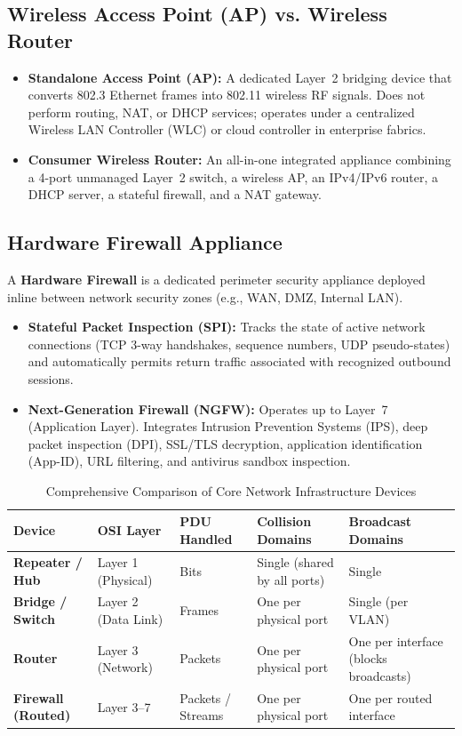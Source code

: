\subsection{Wireless Access Point (AP) vs. Wireless Router}
\begin{itemize}[leftmargin=*]
    \item \textbf{Standalone Access Point (AP):} A dedicated Layer~2 bridging device that converts 802.3 Ethernet frames into 802.11 wireless RF signals. Does not perform routing, NAT, or DHCP services; operates under a centralized Wireless LAN Controller (WLC) or cloud controller in enterprise fabrics.
    \item \textbf{Consumer Wireless Router:} An all-in-one integrated appliance combining a 4-port unmanaged Layer~2 switch, a wireless AP, an IPv4/IPv6 router, a DHCP server, a stateful firewall, and a NAT gateway.
\end{itemize}

\subsection{Hardware Firewall Appliance}
A \textbf{Hardware Firewall} is a dedicated perimeter security appliance deployed inline between network security zones (e.g., WAN, DMZ, Internal LAN).
\begin{itemize}[leftmargin=*]
    \item \textbf{Stateful Packet Inspection (SPI):} Tracks the state of active network connections (TCP 3-way handshakes, sequence numbers, UDP pseudo-states) and automatically permits return traffic associated with recognized outbound sessions.
    \item \textbf{Next-Generation Firewall (NGFW):} Operates up to Layer~7 (Application Layer). Integrates Intrusion Prevention Systems (IPS), deep packet inspection (DPI), SSL/TLS decryption, application identification (App-ID), URL filtering, and antivirus sandbox inspection.
\end{itemize}

\begin{table}[H]
\centering
\small
{}
\begin{tabularx}{\linewidth}{l l l l X}
\toprule
\rowcolor{tableheadercolor}
\textbf{Device} & \textbf{OSI Layer} & \textbf{PDU Handled} & \textbf{Collision Domains} & \textbf{Broadcast Domains} \\
\midrule
\textbf{Repeater / Hub} & Layer 1 (Physical) & Bits & Single (shared by all ports) & Single \\
\textbf{Bridge / Switch} & Layer 2 (Data Link) & Frames & One per physical port & Single (per VLAN) \\
\textbf{Router} & Layer 3 (Network) & Packets & One per physical port & One per interface (blocks broadcasts) \\
\textbf{Firewall (Routed)} & Layer 3--7 & Packets / Streams & One per physical port & One per routed interface \\
\bottomrule
\end{tabularx}
\caption{Comprehensive Comparison of Core Network Infrastructure Devices}
\end{table}

